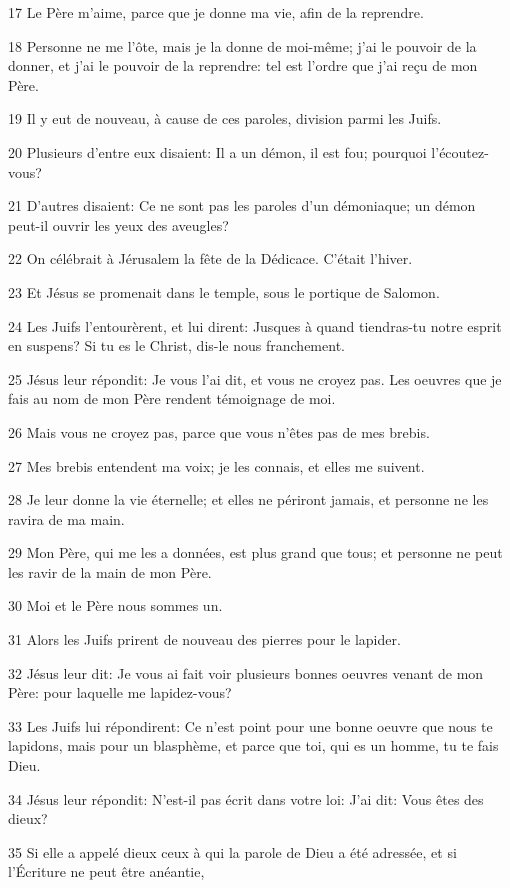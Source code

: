 \par 17 Le Père m'aime, parce que je donne ma vie, afin de la reprendre.
\par 18 Personne ne me l'ôte, mais je la donne de moi-même; j'ai le pouvoir de la donner, et j'ai le pouvoir de la reprendre: tel est l'ordre que j'ai reçu de mon Père.
\par 19 Il y eut de nouveau, à cause de ces paroles, division parmi les Juifs.
\par 20 Plusieurs d'entre eux disaient: Il a un démon, il est fou; pourquoi l'écoutez-vous?
\par 21 D'autres disaient: Ce ne sont pas les paroles d'un démoniaque; un démon peut-il ouvrir les yeux des aveugles?
\par 22 On célébrait à Jérusalem la fête de la Dédicace. C'était l'hiver.
\par 23 Et Jésus se promenait dans le temple, sous le portique de Salomon.
\par 24 Les Juifs l'entourèrent, et lui dirent: Jusques à quand tiendras-tu notre esprit en suspens? Si tu es le Christ, dis-le nous franchement.
\par 25 Jésus leur répondit: Je vous l'ai dit, et vous ne croyez pas. Les oeuvres que je fais au nom de mon Père rendent témoignage de moi.
\par 26 Mais vous ne croyez pas, parce que vous n'êtes pas de mes brebis.
\par 27 Mes brebis entendent ma voix; je les connais, et elles me suivent.
\par 28 Je leur donne la vie éternelle; et elles ne périront jamais, et personne ne les ravira de ma main.
\par 29 Mon Père, qui me les a données, est plus grand que tous; et personne ne peut les ravir de la main de mon Père.
\par 30 Moi et le Père nous sommes un.
\par 31 Alors les Juifs prirent de nouveau des pierres pour le lapider.
\par 32 Jésus leur dit: Je vous ai fait voir plusieurs bonnes oeuvres venant de mon Père: pour laquelle me lapidez-vous?
\par 33 Les Juifs lui répondirent: Ce n'est point pour une bonne oeuvre que nous te lapidons, mais pour un blasphème, et parce que toi, qui es un homme, tu te fais Dieu.
\par 34 Jésus leur répondit: N'est-il pas écrit dans votre loi: J'ai dit: Vous êtes des dieux?
\par 35 Si elle a appelé dieux ceux à qui la parole de Dieu a été adressée, et si l'Écriture ne peut être anéantie,
